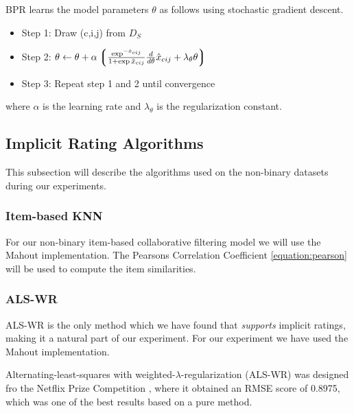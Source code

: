 BPR learns the model parameters $\theta$ as follows using stochastic gradient descent.

\begin{itemize}
\item Step 1: Draw (c,i,j) from $D_S$
\item Step 2: $\theta \leftarrow \theta + \alpha \left\lgroup \frac{\exp^{-\hat{x}_{cij}}}{1+\exp{\hat{x}_{cij}}}  \frac{d}{d \theta} \hat{x}_{cij} + \lambda_{\theta} \theta \right\rgroup$
\item Step 3: Repeat step 1 and 2 until convergence
\end{itemize}

where $\alpha$ is the learning rate and $\lambda_{\theta}$ is the regularization constant.

\subsection{Implicit Rating Algorithms}

This subsection will describe the algorithms used on the non-binary datasets during our
experiments.

\subsubsection{Item-based KNN}

For our non-binary item-based collaborative filtering model we will use the Mahout \cite{mahout}
implementation. The Pearsons Correlation Coefficient \ref{equation:pearson} will be used to compute
the item similarities.

\subsubsection{ALS-WR}


ALS-WR is the only method which we have found that \emph{supports} implicit ratings, making
it a natural part of our experiment. For our experiment we have used the Mahout \cite{mahout} implementation.

Alternating-least-squares with weighted-$\lambda$-regularization (ALS-WR) was designed fro the Netflix Prize
Competition \cite{Netflix}, where it obtained an RMSE score of 0.8975, which was one of the best results based
on a pure method.

